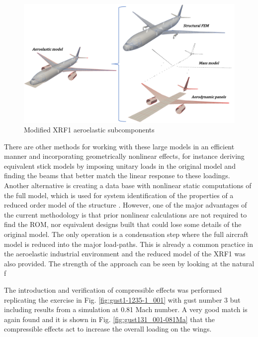 \documentclass[11pt]{article}
\begin{document}
\begin{figure}[th!]
\centering
\includegraphics[width=1.\textwidth]{./img/xrf1-model.pdf}
\caption{Modified XRF1 aeroelastic subcomponents }\label{fig8:xrf1-model}
\end{figure}
There are other methods for working with these large models in an efficient manner and incorporating geometrically nonlinear effects, for instance deriving equivalent stick models by imposing unitary loads \cite{AElsayed2009} in the original model and finding the beams that better match the linear response to these loadings. Another alternative is creating a data base with nonlinear static computations of the full model, which is used for system identification of the properties of a reduced order model of the structure \cite{Medeiros2019}.
 However, one of the major advantages of the current methodology is that prior nonlinear calculations are not required to find the ROM, nor equivalent designs built that could lose some details of the original model. The only operation is a condensation step where the full aircraft model is reduced into the major load-paths. This is already a common practice in the aeroelastic industrial environment and the reduced model of the XRF1 was also provided. The strength of the approach can be seen by looking at the natural f

The introduction and verification of compressible effects was performed replicating the exercise in Fig. \ref{fig:gust1-1235-1_001} with gust number 3 but including results from a simulation at 0.81 Mach number. A very good match is again found and it is shown in Fig. \ref{fig:gust131_001-081Ma} that the compressible effects act to increase the overall loading on the wings.  
\end{document}
